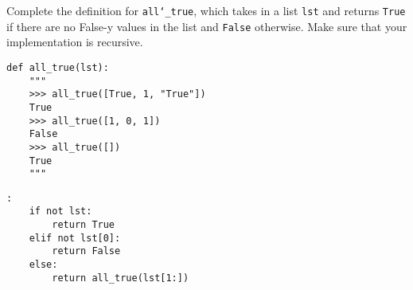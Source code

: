 \begin{blocksection}
\question Complete the definition for \texttt{all\char`_true}, which takes in a list \texttt{lst}
and returns \texttt{True} if there are no False-y values in the list and \texttt{False} otherwise.
Make sure that your implementation is recursive.

\begin{lstlisting}
def all_true(lst):
    """
    >>> all_true([True, 1, "True"])
    True
    >>> all_true([1, 0, 1])
    False
    >>> all_true([])
    True
    """
\end{lstlisting}

\begin{solution}[1in]
\begin{lstlisting}:
    if not lst:
        return True
    elif not lst[0]:
        return False
    else:
        return all_true(lst[1:])
\end{lstlisting}
\end{solution}
\end{blocksection}
